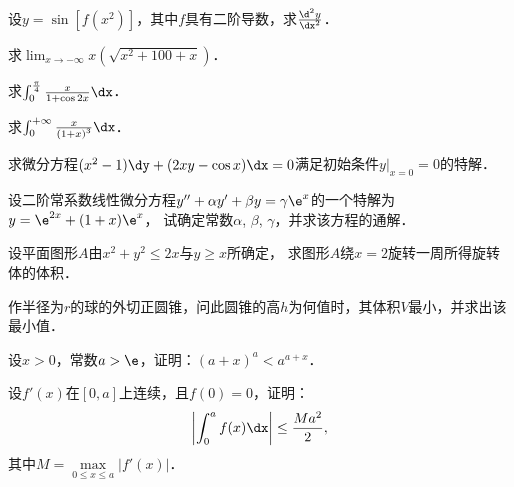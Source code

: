 \documentclass[plain,noanswer,medmath]{../../template/jnuexam}
\begin{document}


\begin{problem}
设$y = \sin[f(x^2)]$，其中$f$具有二阶导数，求$\frac{\d^2y}{\dx^2}$．
\end{problem}


\begin{problem}
求$\lim_{x \to -\infty} x(\sqrt{x^2 + 100 + x})$．
\end{problem}


\begin{problem}
求$\int_0^{\frac{\pi}{4}} \frac{x}{1 + \cos 2x} \dx$．
\end{problem}


\begin{problem}
求$\int_0^{+\infty} \frac{x}{\left(1 + x \right)^3} \dx$．
\end{problem}


\begin{problem}
求微分方程$(x^2 - 1)\dy + (2xy - \cos x)\dx = 0$满足初始条件$y|_{x = 0} = 0$的特解．
\end{problem}



\begin{problem}
设二阶常系数线性微分方程$y'' + \alpha y' + \beta y = \gamma \e^x$的一个特解为$y =\e^{2x} + (1 + x)\e^x$，
试确定常数$\alpha$, $\beta$, $\gamma$，并求该方程的通解．
\end{problem}



\begin{problem}
设平面图形$A$由$x^2 + y^2 \le 2x$与$y \ge x$所确定，
求图形$A$绕$x = 2$旋转一周所得旋转体的体积．
\end{problem}



\begin{problem}
作半径为$r$的球的外切正圆锥，问此圆锥的高$h$为何值时，其体积$V$最小，并求出该最小值．
\end{problem}



\begin{problem}
设$x > 0$，常数$a > \e$，证明：$(a + x)^a < a^{a + x}$．
\end{problem}



\begin{problem}
设$f'(x)$在$[0,a]$上连续，且$f(0) = 0$，证明：
$$\left| \int_0^a f(x)\dx \right| \le \frac{Ma^2}{2},$$
其中$M = \max\limits_{0 \le x \le a} \left| f'(x) \right|$．
\end{problem}
\end{document}
